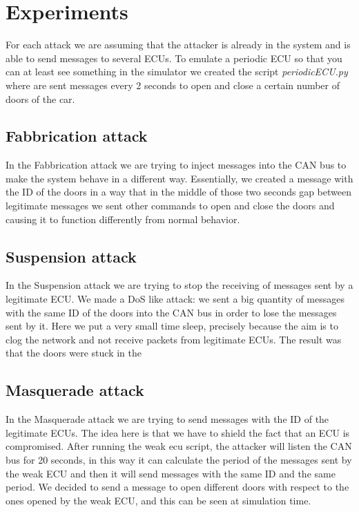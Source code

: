 \documentclass[12pt]{article}
\begin{document}
\section{Experiments}
For each attack we are assuming that the attacker is already in the system and is able to send messages to 
several ECUs. To emulate a periodic ECU so that you can at least see something in the simulator we created 
the script \textit{periodicECU.py} where are sent messages every 2 seconds to open and close a certain number of 
doors of the car.  
\subsection{Fabbrication attack}
In the Fabbrication attack we are trying to inject messages into the CAN bus to make the system behave in a 
different way. Essentially, we created a message with the ID of the doors in a way that in the middle of 
those two seconds gap between legitimate messages we sent other commands to open and close the doors and 
causing it to function differently from normal behavior.
\subsection{Suspension attack}
In the Suspension attack we are trying to stop the receiving of messages sent by a legitimate ECU. We made 
a DoS like attack: we sent a big quantity of messages with the same ID of the doors into the CAN bus in order 
to lose the messages sent by it. Here we put a very small time sleep, precisely because the aim is to clog 
the network and not receive packets from legitimate ECUs. The result was that the doors were stuck in the 

\subsection{Masquerade attack}
In the Masquerade attack we are trying to send messages with the ID of the legitimate ECUs. The idea here 
is that we have to shield the fact that an ECU is compromised. After running the weak ecu script, the 
attacker will listen the CAN bus for 20 seconds, in this way it can calculate the period of the messages 
sent by the weak ECU and then it will send messages with the same ID and the same period. We decided to 
send a message to open different doors with respect to the ones opened by the weak ECU, and this can be 
seen at simulation time.
\end{document}
